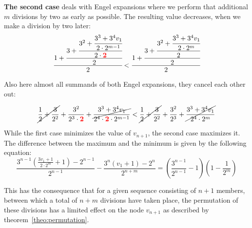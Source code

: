 \documentclass[12pt]{amsart}
\theoremstyle{definition}
\begin{document}
\par\bigskip\noindent
\textbf{The second case} deals with Engel expansions where we perform that additional $m$ divisions by two as early as possible. The resulting value decreases, when we make a division by two later:
\[
\cfrac{1+\cfrac{3+\cfrac{3^2+\cfrac{3^3+3^4v_1}{2\cdot2^{m-1}}}{2\cdot\textcolor{red}{\mathbf{2}}}}{2}}{2}
<
\cfrac{1+\cfrac{3+\cfrac{3^2+\cfrac{3^3+3^4v_1}{2\cdot2^m}}{2}}{2}}{2}
\]

\par\bigskip
Also here almost all summands of both Engel expansions, they cancel each other out:

\[
\cancel{\frac{1}{2}+\frac{3}{2^2}}+\frac{3^2}{2^3\cdot\textcolor{red}{\mathbf{2}}}+\cancel{\frac{3^3+3^4v_1}{2^4\cdot\textcolor{red}{\mathbf{2}}\cdot2^{m-1}}}
<
\cancel{\frac{1}{2}+\frac{3}{2^2}}+\frac{3^2}{2^3}+\cancel{\frac{3^3+3^4v_1}{2^4\cdot2^m}}
\]

\par\medskip
While the first case minimizes the value of $v_{n+1}$, the second case maximizes it. The difference between the maximum and the minimum is given by the following equation:
\[
\frac{3^{n-1}\left(\frac{3v_1+1}{2\cdot2^m}+1\right)-2^{n-1}}{2^{n-1}}-\frac{3^n\left(v_1+1\right)-2^n}{2^{n+m}}=\left(\frac{3^{n-1}}{2^{n-1}}-1\right)\left(1-\frac{1}{2^m}\right)
\]

\par\medskip
This has the consequence that for a given sequence consisting of $n+1$ members, between which a total of $n+m$ divisions have taken place, the permutation of these divisions has a limited effect on the node $v_{n+1}$ as described by theorem~\ref{theo:permutation}.
\end{document}
